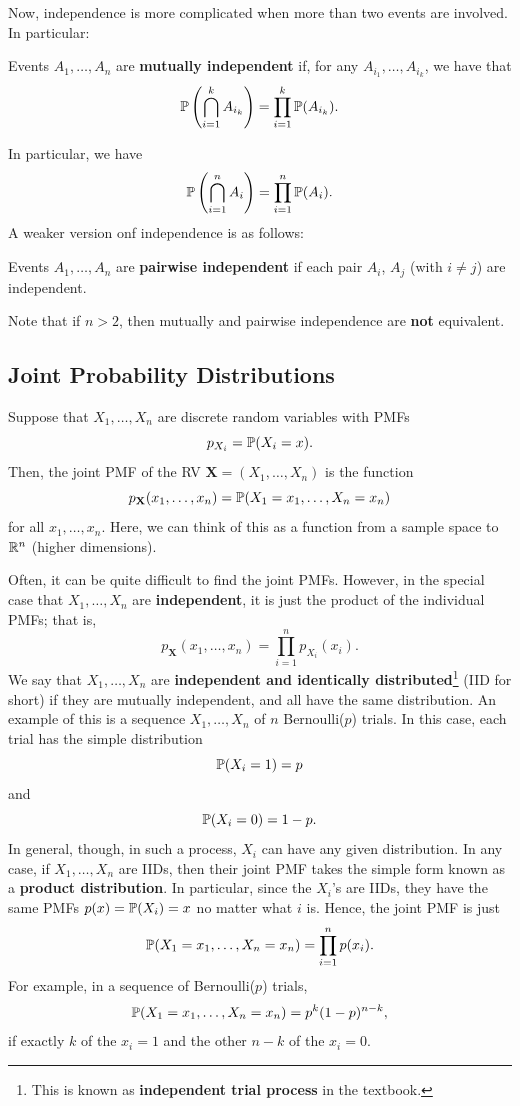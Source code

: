 \documentclass[letterpaper]{article}
\begin{document}
Now, independence is more complicated when more than two events are involved. In particular:
\begin{definition}{}{}
    Events $A_1, \dots, A_n$ are \textbf{mutually independent} if, for any $A_{i_1}, \dots, A_{i_k}$, we have that 
    \[\mathbb{P}\left(\bigcap_{i = 1}^{k} A_{i_k} \right) = \prod_{i = 1}^{k} \mathbb{P}(A_{i_k}).\]
\end{definition}
In particular, we have
\[\mathbb{P}\left(\bigcap_{i = 1}^{n} A_{i} \right) = \prod_{i = 1}^{n} \mathbb{P}(A_{i}).\]
A weaker version onf independence is as follows: 
\begin{definition}{}{}
    Events $A_1, \dots, A_n$ are \textbf{pairwise independent} if each pair $A_i$, $A_j$ (with $i \neq j$) are independent.
\end{definition}
Note that if $n > 2$, then mutually and pairwise independence are \textbf{not} equivalent.

\subsection{Joint Probability Distributions}
Suppose that $X_1, \dots, X_n$ are discrete random variables with PMFs 
\[p_{X_i} = \mathbb{P}(X_i = x).\]
Then, the joint PMF of the RV $\mathbf{X} = (X_1, \dots, X_n)$ is the function 
\[p_{\mathbf{X}}(x_1, \dots, x_n) = \mathbb{P}(X_1 = x_1, \dots, X_n = x_n)\]
for all $x_1, \dots, x_n$. Here, we can think of this as a function from a sample space to $\mathbb{R}^n$ (higher dimensions).

\bigskip 

Often, it can be quite difficult to find the joint PMFs. However, in the special case that $X_1, \dots, X_n$ are \textbf{independent}, it is just the product of the individual PMFs; that is, 
\[p_{\mathbf{X}}(x_1, \dots, x_n) = \prod_{i = 1}^{n} p_{X_i}(x_i).\]
We say that $X_1, \dots, X_n$ are \textbf{independent and identically distributed}\footnote{This is known as \textbf{independent trial process} in the textbook.} (IID for short) if they are mutually independent, and all have the same distribution. An example of this is a sequence $X_1, \dots, X_n$ of $n$ Bernoulli($p$) trials. In this case, each trial has the simple distribution 
\[\mathbb{P}(X_i = 1) = p\]
and 
\[\mathbb{P}(X_i = 0) = 1 - p.\]
In general, though, in such a process, $X_i$ can have any given distribution. In any case, if $X_1, \dots, X_n$ are IIDs, then their joint PMF takes the simple form known as a \textbf{product distribution}. In particular, since the $X_i$'s are IIDs, they have the same PMFs $p(x) = \mathbb{P}(X_i) = x$ no matter what $i$ is. Hence, the joint PMF is just 
\[\mathbb{P}(X_1 = x_1, \dots, X_n = x_n) = \prod_{i = 1}^{n} p(x_i).\]
For example, in a sequence of Bernoulli($p$) trials, 
\[\mathbb{P}(X_1 = x_1, \dots, X_n = x_n) = p^k (1 - p)^{n - k},\]
if exactly $k$ of the $x_i = 1$ and the other $n - k$ of the $x_i = 0$. 
\end{document}
